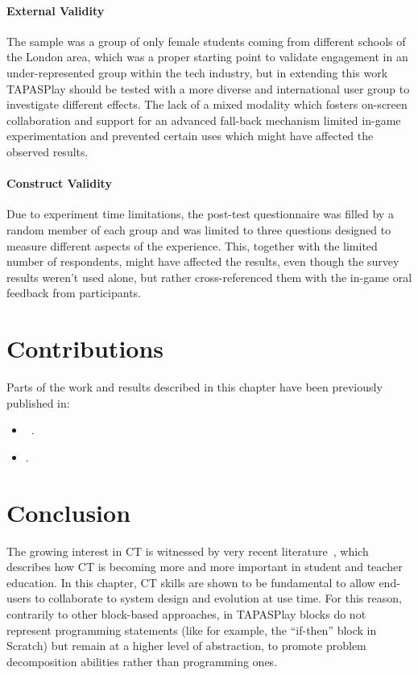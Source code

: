 \paragraph{External Validity} The sample was a group of only female students coming from different schools of the London area, which was a proper starting point to validate engagement in an under-represented group within the tech industry, but in extending this work TAPASPlay should be tested with a more diverse and international user group to investigate different effects. The lack of a mixed modality which fosters on-screen collaboration and support for an advanced fall-back mechanism limited in-game experimentation and prevented certain uses which might have affected the observed results.

\paragraph{Construct Validity} Due to experiment time lim\-i\-ta\-tions, the post-test ques\-tion\-naire was filled by a ran\-dom member of each group and was limited to three questions designed to measure different aspects of the experience. This, together with the limited number of respondents, might have affected the results, even though the survey results weren't used alone, but rather cross-referenced them with the in-game oral feedback from participants.

\section{Contributions}
Parts of the work and results described in this chapter have been previously published in:
\begin{itemize}
  \item {}~\cite{malizia2017eudtapasplay,malizia2017vltapasplay,fogli2017sustaining}.
  \item {}.
\end{itemize}

\section{Conclusion}
The growing interest in \ac{CT} is witnessed by very recent literature~\cite{Yadav:2017ir}, which describes how \ac{CT} is becoming more and more important in student and teacher education. In this chapter, \ac{CT} skills are shown to be fundamental to allow end-users to collaborate to system design and evolution at use time. For this reason, contrarily to other block-based approaches, in TAPASPlay blocks do not represent programming statements (like for example, the ``if-then'' block in Scratch) but remain at a higher level of abstraction, to promote problem decomposition abilities rather than programming ones.

